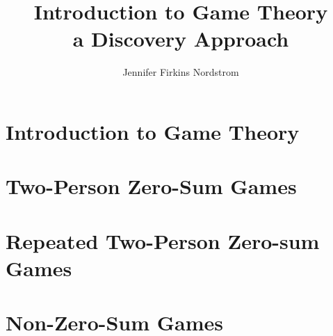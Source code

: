\documentclass[12pt]{amsbook}
\title[Introduction to Game Theory]%
{Introduction to Game Theory\\
 a Discovery Approach}
\author{Jennifer Firkins Nordstrom}
\begin{document}
\frontmatter
\maketitle
\tableofcontents

\mainmatter


\chapter{Introduction to Game Theory}









\chapter{Two-Person Zero-Sum Games}



















\chapter{Repeated Two-Person Zero-sum Games}











\chapter{Non-Zero-Sum Games}











\end{document}
